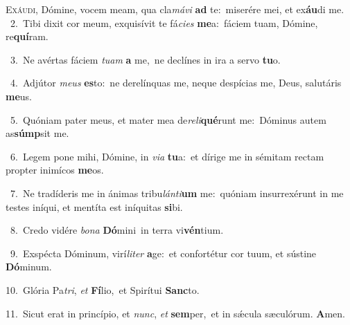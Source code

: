 \lettrine{\initial\textcolor{\initialcolor}{E}}{xáudi,} Dómine, vocem meam, qua cla\-\textit{má}\-\textit{vi} \textbf{ad} te:~\star miserére mei, et ex\-\textbf{áu}\-di me.\\
{\numbfont\textcolor{\numbcolor}{~2.}}~Tibi dixit cor meum, exquisívit te fá\-\textit{ci}\-\textit{es} \textbf{me}\-a:~\star fáciem tuam, Dómine, re\-\textbf{quí}\-ram.\par
{\numbfont\textcolor{\numbcolor}{~3.}}~Ne avértas fáciem \textit{tu}\-\textit{am} \textbf{a} me,~\star ne declínes in ira a servo \textbf{tu}\-o.\par
{\numbfont\textcolor{\numbcolor}{~4.}}~Adjútor \textit{me}\-\textit{us} \textbf{es}\-to:~\star ne derelínquas me, neque despícias me, Deus, salutáris \textbf{me}\-us.\par
{\numbfont\textcolor{\numbcolor}{~5.}}~Quóniam pater meus, et mater mea de\-\textit{re}\-\textit{li}\textbf{qué}runt me:~\star Dóminus autem as\-\textbf{súmp}\-sit me.\par
{\numbfont\textcolor{\numbcolor}{~6.}}~Legem pone mihi, Dómine, in \textit{vi}\-\textit{a} \textbf{tu}\-a:~\star et dírige me in sémitam rectam propter inimícos \textbf{me}\-os.\par
{\numbfont\textcolor{\numbcolor}{~7.}}~Ne tradíderis me in ánimas tribu\-\textit{lán}\-\textit{ti}\textbf{um} me:~\star quóniam insurrexérunt in me testes iníqui, et mentíta est iníquitas \textbf{si}\-bi.\par
{\numbfont\textcolor{\numbcolor}{~8.}}~Credo vidére \textit{bo}\-\textit{na} \textbf{Dó}\-mini~\star in terra vi\-\textbf{vén}\-tium.\par
{\numbfont\textcolor{\numbcolor}{~9.}}~Exspécta Dóminum, virí\-\textit{li}\-\textit{ter} \textbf{a}\-ge:~\star et confortétur cor tuum, et sústine \textbf{Dó}\-minum.\par
{\numbfont\textcolor{\numbcolor}{10.}}~Glória Pa\-\textit{tri}\-, \textit{et} \textbf{Fí}\-lio,~\star et Spirítui \textbf{Sanc}\-to.\par
{\numbfont\textcolor{\numbcolor}{11.}}~Sicut erat in princípio, et \textit{nunc}\-, \textit{et} \textbf{sem}\-per,~\star et in sǽcula sæculórum. \textbf{A}\-men.\par
